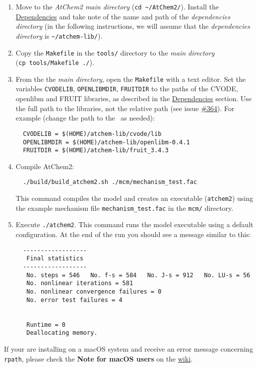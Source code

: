 \begin{enumerate}
\item Move to the \emph{AtChem2 main directory} (\texttt{cd\
    \textasciitilde{}/AtChem2/}). Install the
  \hyperref[sec:dependencies]{Dependencies} and take note of the name
  and path of the \emph{dependencies directory} (in the following
  instructions, we will assume that the \emph{dependencies directory}
  is \texttt{\textasciitilde{}/atchem-lib/}).
\item Copy the \texttt{Makefile} in the \texttt{tools/} directory to
  the \emph{main directory} (\texttt{cp\ tools/Makefile\ ./}).
\item From the the \emph{main directory}, open the \texttt{Makefile}
  with a text editor. Set the variables \texttt{CVODELIB},
  \texttt{OPENLIBMDIR}, \texttt{FRUITDIR} to the paths of the CVODE,
  openlibm and FRUIT libraries, as described in the
  \hyperref[sec:dependencies]{Dependencies} section. Use the full path
  to the libraries, not the relative path (see issue
  \href{https://github.com/AtChem/AtChem2/issues/364}{\#364}). For
  example (change the path to the \depdir\ as needed):
  \begin{verbatim}
  CVODELIB = $(HOME)/atchem-lib/cvode/lib
  OPENLIBMDIR = $(HOME)/atchem-lib/openlibm-0.4.1
  FRUITDIR = $(HOME)/atchem-lib/fruit_3.4.3
  \end{verbatim}
\item Compile AtChem2:
  \begin{verbatim}
  ./build/build_atchem2.sh ./mcm/mechanism_test.fac
  \end{verbatim}
  This command compiles the model and creates an executable
  (\texttt{atchem2}) using the example mechanism file
  \texttt{mechanism\_test.fac} in the \texttt{mcm/} directory.
\item Execute \verb|./atchem2|. This command runs the model executable
  using a default configuration. At the end of the run you should see
  a message similar to this:
  \begin{verbatim}
  ------------------
   Final statistics
  ------------------
   No. steps = 546   No. f-s = 584   No. J-s = 912   No. LU-s = 56
   No. nonlinear iterations = 581
   No. nonlinear convergence failures = 0
   No. error test failures = 4


   Runtime = 0
   Deallocating memory.
  \end{verbatim}
\end{enumerate}

If your are installing on a macOS system and receive an error message
concerning \texttt{rpath}, please check the \textbf{Note for macOS users}
on the \href{https://github.com/AtChem/AtChem2/wiki/How-to-install-AtChem2}{wiki}.

